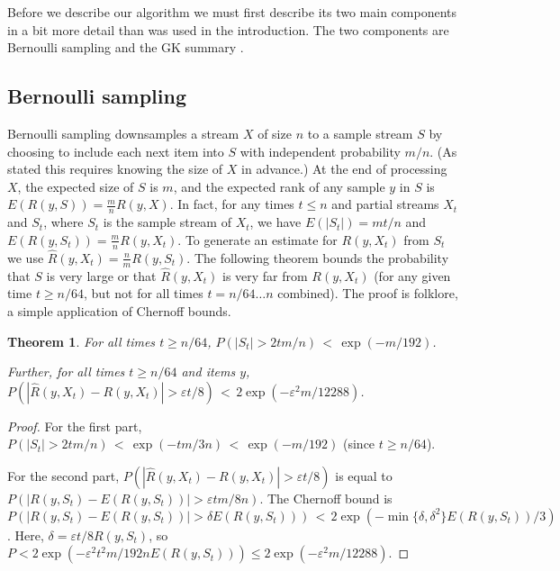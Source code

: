 \documentclass{article}
\theoremstyle{plain}
\newtheorem{theorem}{Theorem}[section]
\def\ep{\varepsilon}
\newcommand{\p}[1]{(#1)}
\newcommand{\pc}[1]{\{#1\}}
\newcommand{\abs}[1]{|#1|}
\newcommand{\set}[1]{\pc{#1}}
\newcommand{\expp}[1]{\exp\p{#1}}
\renewcommand{\P}[1]{P\p{#1}}
\newcommand{\E}[1]{E\p{#1}}
\newcommand{\rank}[2]{R\p{#1,#2}}
\newcommand{\rhat}[2]{\hat{R}\p{#1,#2}}
\begin{document}
Before we describe our algorithm we must first describe its two main components
in a bit more detail than was used in the introduction. The two components are
Bernoulli sampling and the GK summary \cite{GK2001}.



\subsection{Bernoulli sampling}

Bernoulli sampling downsamples a stream $X$ of size $n$ to a sample stream $S$
by choosing to include each next item into $S$ with independent probability
$m/n$. (As stated this requires knowing the size of $X$ in advance.) At the end
of processing $X$, the expected size of $S$ is $m$, and the expected rank of any
sample $y$ in $S$ is $\E{\rank{y}{S}} = \frac{m}{n} \rank{y}{X}$.
In fact, for any times $t \le n$ and partial streams $X_t$ and $S_t$, where
$S_t$ is the sample stream of $X_t$, we have $\E{|S_t|} = m t / n$ and
$\E{\rank{y}{S_t}} = \frac{m}{n} \rank{y}{X_t}$. To generate an estimate for
$\rank{y}{X_t}$ from $S_t$ we use $\rhat{y}{X_t} = \frac{n}{m} \rank{y}{S_t}$.
The following theorem bounds the probability that $S$ is very large or that
$\rhat{y}{X_t}$ is very far from $\rank{y}{X_t}$ (for any given time $t \ge
n/64$, but not for all times $t = n/64 \ldots n$ combined). The proof is
folklore, a simple application of Chernoff bounds.

\begin{theorem}
  \label{thm:bernoulli}
  For all times $t \ge n/64$, $\P{\abs{S_t} > 2 t m / n} \,<\, \expp{-m/192}$.

  Further, for all times $t \ge n/64$ and items $y$, $\P{\abs{\rhat{y}{X_t} -
      \rank{y}{X_t}} > \ep t / 8} \,<\, 2 \expp{-\ep^2 m/12288}$.
\end{theorem}
\begin{proof}
  For the first part, $\P{\abs{S_t} > 2 t m / n} \,<\, \expp{-t m / 3 n} \,<\,
  \expp{-m / 192}$ (since $t \ge n/64$).

  For the second part, $\P{\abs{\rhat{y}{X_t} - \rank{y}{X_t}} > \ep t / 8}$ is
  equal to $\P{\abs{\rank{y}{S_t} - \E{\rank{y}{S_t}}} > \ep t m / 8 n}$. The
  Chernoff bound is $\P{\abs{\rank{y}{S_t} - \E{\rank{y}{S_t}}} > \delta
    \E{\rank{y}{S_t}}} \,<\, 2 \expp{-\min\set{\delta,\delta^2}
    \E{\rank{y}{S_t}} / 3}$. Here, $\delta = \ep t / 8 \rank{y}{S_t}$, so $P < 2
  \expp{-\ep^2 t^2 m / 192 n \E{\rank{y}{S_t}}} \le 2 \expp{-\ep^2 m / 12288}$.
\end{proof}
\end{document}
